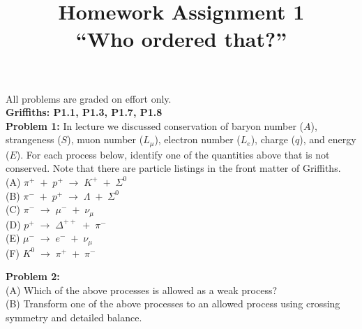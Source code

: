\documentclass[12pt]{article}
\begin{document}
\newcommand{\ihbar}{\ensuremath{i \hbar}}
\newcommand{\dPsidt}{\ensuremath{ \frac{\partial \Psi}{\partial t} }}
\newcommand{\dPsidx}{\ensuremath{ \frac{\partial \Psi}{\partial x} }}
\newcommand{\ddPsidx}{\ensuremath{ \frac{\partial^2 \Psi}{\partial x^2} }}
\newcommand{\dPssdt}{\ensuremath{ \frac{\partial \Psi^*}{\partial t} }}
\newcommand{\dPssdx}{\ensuremath{ \frac{\partial \Psi^*}{\partial x} }}
\newcommand{\ddPssdx}{\ensuremath{ \frac{\partial^2 \Psi^*}{\partial x^2} }}

\newcommand{\dphidt}{\ensuremath{ \frac{d \phi}{dt} }}
\newcommand{\dpsidx}{\ensuremath{ \frac{d \psi}{dx} }}
\newcommand{\ddpsidx}{\ensuremath{ \frac{d^2 \psi}{dx^2} }}


\date{\vspace{-5ex}}

\title{Homework Assignment 1 \\ ``Who ordered that?''}

\maketitle

\noindent
All problems are graded on effort only.\\

\noindent
{\bf Griffiths: P1.1, P1.3, P1.7, P1.8} \\
  
\noindent
{\bf Problem 1:}  In lecture we discussed conservation of baryon number ($A$), strangeness ($S$), muon number ($L_\mu$), electron number ($L_e$), charge ($q$), and energy ($E$).  For each process below, identify one of the quantities above that is not conserved.  Note that there are particle listings in the front matter of Griffiths.\\

\noindent
(A) $\pi^+ \; + \; p^+ \; \to \; K^+ \; + \; \Sigma^0$\\[5pt]
\noindent
(B) $\pi^- \; + \; p^+ \; \to \; \Lambda \; + \; \Sigma^0$\\[5pt]
\noindent
(C) $\pi^- \; \to \; \mu^- \; + \; \nu_\mu$\\[5pt]
\noindent
(D) $p^+ \; \to \; \Delta^{++} \; + \; \pi^-$\\[5pt]
\noindent
(E) $\mu^- \; \to \; e^- \; + \; \nu_\mu$\\[5pt]
\noindent
(F) $K^0 \; \to \; \pi^+ \; + \; \pi^-$\\[5pt]
\noindent


\noindent
{\bf Problem 2:}\\[5pt] 
(A) Which of the above processes is allowed as a weak process?\\[5pt]
(B) Transform one of the above processes to an allowed process using crossing symmetry and detailed balance.
\end{document}
